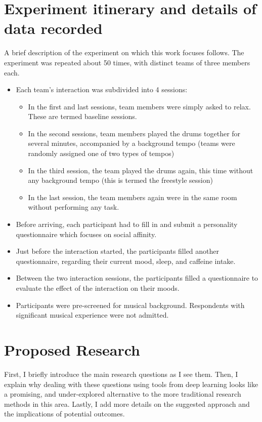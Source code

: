 \documentclass[a4paper, 11pt]{article}      %
\begin{document}
\section{Experiment itinerary and details of data recorded}
A brief description of the experiment on which this work focuses follows. The experiment was repeated about 50 times, with distinct teams of three members each.
\begin{itemize}
    \item Each team's interaction was subdivided into 4 sessions:
    \begin{itemize}
        \item In the first and last sessions, team members were simply asked to relax. These are termed baseline sessions.
        \item In the second sessions, team members played the drums together for several minutes, accompanied by a background tempo (teams were randomly assigned one of two types of tempos)
        \item In the third session, the team played the drums again, this time without any background tempo (this is termed the freestyle session)
        \item In the last session, the team members again were in the same room without performing any task.
    \end{itemize}
    \item Before arriving, each participant had to fill in and submit a personality questionnaire which focuses on social affinity.
    \item Just before the interaction started, the participants filled another questionnaire, regarding their current mood, sleep, and caffeine intake.
    \item Between the two interaction sessions, the participants filled a questionnaire to evaluate the effect of the interaction on their moods.
    \item Participants were pre-screened for musical  background. Respondents with significant musical experience were not admitted.
\end{itemize}



\section{Proposed Research}
First, I briefly introduce the main research questions as I see them. Then, I explain why dealing with these questions using tools from deep learning looks like a promising, and under-explored alternative to the more traditional research methods in this area. Lastly, I add more details on the suggested approach and the implications of potential outcomes.
\end{document}
